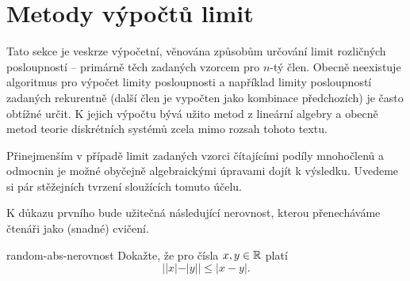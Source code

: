 \section{Metody výpočtů limit}
\label{sec:metody-vypoctu-limit}

Tato sekce je veskrze výpočetní, věnována způsobům určování limit rozličných
posloupností -- primárně těch zadaných vzorcem pro $n$-tý člen. Obecně
neexistuje algoritmus pro výpočet limity posloupnosti a například limity
posloupností zadaných rekurentně (další člen je vypočten jako kombinace
předchozích) je často obtížné určit. K jejich výpočtu bývá užito metod z
lineární algebry a obecně metod teorie diskrétních systémů zcela mimo rozsah
tohoto textu.

Přinejmenším v případě limit zadaných  vzorci čítajícími podíly
mnohočlenů a odmocnin je možné obyčejně algebraickými úpravami dojít k výsledku.
Uvedeme si pár stěžejních tvrzení sloužících tomuto účelu.

K důkazu prvního bude užitečná následující nerovnost, kterou přenecháváme
čtenáři jako (snadné) cvičení.

\begin{exercise}{}{random-abs-nerovnost}
 Dokažte, že pro čísla $x,y \in \mathbb{R}$ platí
 \[
  | |x| - |y| | \leq |x - y|.
 \]
\end{exercise}

